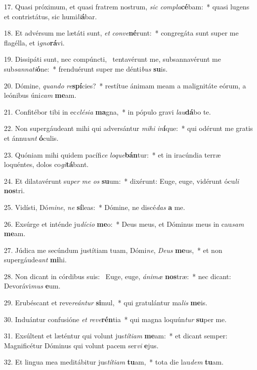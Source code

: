 17. Quasi próximum, et quasi fratrem nostrum, \textit{sic} \textit{com}\textit{pla}\textbf{cé}bam:~*  quasi lugens et contristátus, sic humi\textit{li}\textbf{á}bar.\

18. Et advérsum me lætáti sunt, \textit{et} \textit{con}\textit{ve}\textbf{né}runt:~*  congregáta sunt super me flagélla, et i\textit{gno}\textbf{rá}vi.\

19. Dissipáti sunt, nec compúncti, \dag\  tentavérunt me, subsannavérunt me sub\textit{san}\textit{na}\textit{ti}\textbf{ó}ne:~*  frenduérunt super me dénti\textit{bus} \textbf{su}is.\

20. Dómine, \textit{quan}\textit{do} \textit{re}\textbf{spí}cies?~*  restítue ánimam meam a malignitáte eórum, a leónibus úni\textit{cam} \textbf{me}am.\

21. Confitébor tibi in ec\textit{clé}\textit{si}\textit{a} \textbf{ma}gna,~*  in pópulo gravi \textit{lau}\textbf{dá}bo te.\

22. Non supergáudeant mihi qui adversántur \textit{mi}\textit{hi} \textit{in}\textbf{í}que:~*  qui odérunt me gratis et ánnu\textit{unt} \textbf{ó}culis.\

23. Quóniam mihi quidem pacífi\textit{ce} \textit{lo}\textit{que}\textbf{bán}tur:~*  et in iracúndia terræ loquéntes, dolos co\textit{gi}\textbf{tá}bant.\

24. Et dilatavérunt su\textit{per} \textit{me} \textit{os} \textbf{su}um:~*  dixérunt: Euge, euge, vidérunt ócu\textit{li} \textbf{nos}tri.\

25. Vidísti, Dó\textit{mi}\textit{ne}, \textit{ne} \textbf{sí}leas:~*  Dómine, ne discé\textit{das} \textbf{a} me.\

26. Exsúrge et inténde ju\textit{dí}\textit{ci}\textit{o} \textbf{me}o:~*  Deus meus, et Dóminus meus in cau\textit{sam} \textbf{me}am.\

27. Júdica me secúndum justítiam tuam, Dómi\textit{ne}, \textit{De}\textit{us} \textbf{me}us,~*  et non supergáude\textit{ant} \textbf{mi}hi.\

28. Non dicant in córdibus suis: \dag\  Euge, euge, \textit{á}\textit{ni}\textit{mæ} \textbf{nos}træ:~*  nec dicant: Devorávi\textit{mus} \textbf{e}um.\

29. Erubéscant et reve\textit{re}\textit{án}\textit{tur} \textbf{si}mul,~*  qui gratulántur ma\textit{lis} \textbf{me}is.\

30. Induántur confusióne \textit{et} \textit{re}\textit{ve}\textbf{rén}tia~*  qui magna loquún\textit{tur} \textbf{su}per me.\

31. Exsúltent et læténtur qui volunt jus\textit{tí}\textit{ti}\textit{am} \textbf{me}am:~*  et dicant semper: Magnificétur Dóminus qui volunt pacem ser\textit{vi} \textbf{e}jus.\

32. Et lingua mea meditábitur jus\textit{tí}\textit{ti}\textit{am} \textbf{tu}am,~*  tota die lau\textit{dem} \textbf{tu}am.\

